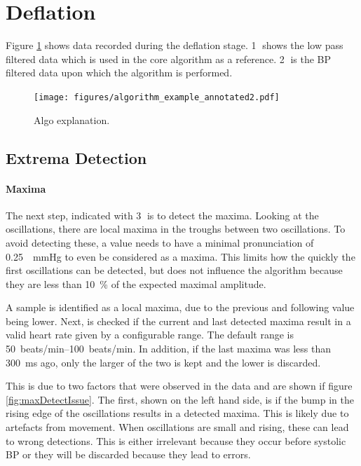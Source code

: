 \section{Deflation}
Figure \ref{fig:algoExplain} shows data recorded during the deflation stage. \textcircled{1} shows the low pass filtered data which is used in the core algorithm as a reference. \textcircled{2} is the BP filtered data upon which the algorithm is performed. 

\begin{figure}[ht]
\centering
\texttt{[image: figures/algorithm\_example\_annotated2.pdf]}
\caption{Algo explanation.}
\label{fig:algoExplain}
\end{figure}



\subsection{Extrema Detection}
\paragraph{Maxima}The next step, indicated with \textcircled{3} is to detect the maxima. Looking at the oscillations, there are local maxima in the troughs between two oscillations. To avoid detecting these, a value needs to have a minimal pronunciation of \SI{0.25}{\Delta\mmHg} to even be considered as a maxima. This limits how the quickly the first oscillations can be detected, but does not influence the algorithm because they are less than \SI{10}{\percent} of the expected maximal amplitude.

A sample is identified as a local maxima, due to the previous and following value being lower. Next, is checked if the current and last detected maxima result in a valid heart rate given by a configurable range. The default range is \SIrange{50}{100}{beats/\minute}. In addition, if the last maxima was less than \SI{300}{\milli\second} ago, only the larger of the two is kept and the lower is discarded.

This is due to two factors that were observed in the data and are shown if figure \ref{fig:maxDetectIssue}. The first, shown on the left hand side, is if the bump in the rising edge of the oscillations results in a detected maxima. This is likely due to artefacts from movement. When oscillations are small and rising, these can lead to wrong detections. This is either irrelevant because they occur before systolic BP or they will be discarded because they lead to errors. 

